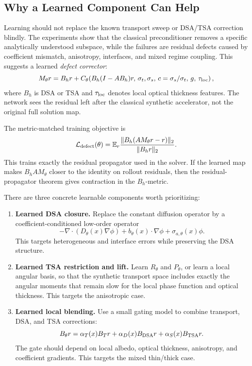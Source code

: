 \documentclass[11pt]{article}
\begin{document}
\subsection{Why a Learned Component Can Help}

Learning should not replace the known transport sweep or DSA/TSA correction
blindly. The experiments show that the classical preconditioner removes a
specific analytically understood subspace, while the failures are residual
defects caused by coefficient mismatch, anisotropy, interfaces, and mixed
regime coupling. This suggests a learned \emph{defect corrector}:
\[
  M_\theta r
  =
  B_h r
  +
  C_\theta\!\left(
    B_h(I-AB_h)r,\,
    \sigma_t,\sigma_s,\,
    c=\sigma_s/\sigma_t,\,
    g,\,
    \tau_{\rm loc}
  \right),
\]
where \(B_h\) is DSA or TSA and \(\tau_{\rm loc}\) denotes local optical
thickness features. The network sees the residual left after the classical
synthetic accelerator, not the original full solution map.

The metric-matched training objective is
\[
  \mathcal L_{\rm defect}(\theta)
  =
  \mathbb E_r
  \frac{
    \|B_h(A M_\theta r-r)\|_2
  }{
    \|B_h r\|_2
  }.
\]
This trains exactly the residual propagator used in the solver. If the learned
map makes \(B_hAM_\theta\) closer to the identity on rollout residuals, then
the residual-propagator theorem gives contraction in the \(B_h\)-metric.

There are three concrete learnable components worth prioritizing:
\begin{enumerate}
\item \textbf{Learned DSA closure.} Replace the constant diffusion operator by
a coefficient-conditioned low-order operator
\[
  -\nabla\cdot(D_\theta(x)\nabla\phi)
  +b_\theta(x)\cdot\nabla\phi+\sigma_{a,\theta}(x)\phi .
\]
This targets heterogeneous and interface errors while preserving the DSA
structure.

\item \textbf{Learned TSA restriction and lift.} Learn \(R_\theta\) and
\(P_\theta\), or learn a local angular basis, so that the synthetic transport
space includes exactly the angular moments that remain slow for the local
phase function and optical thickness. This targets the anisotropic case.

\item \textbf{Learned local blending.} Use a small gating model to combine
transport, DSA, and TSA corrections:
\[
  B_{\theta}r
  =
  \alpha_T(x)B_T r
  +\alpha_D(x)B_{\rm DSA}r
  +\alpha_S(x)B_{\rm TSA}r .
\]
The gate should depend on local albedo, optical thickness, anisotropy, and
coefficient gradients. This targets the mixed thin/thick case.
\end{enumerate}
\end{document}
